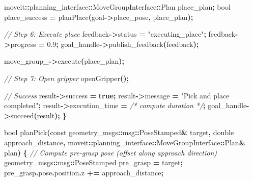 \documentclass[
]{article}
\newenvironment{Shaded}{\begin{snugshade}}{\end{snugshade}}
\newcommand{\AttributeTok}[1]{\textcolor[rgb]{0.13,0.29,0.53}{#1}}
\newcommand{\CommentTok}[1]{\textcolor[rgb]{0.56,0.35,0.01}{\textit{#1}}}
\newcommand{\DataTypeTok}[1]{\textcolor[rgb]{0.13,0.29,0.53}{#1}}
\newcommand{\FloatTok}[1]{\textcolor[rgb]{0.00,0.00,0.81}{#1}}
\newcommand{\KeywordTok}[1]{\textcolor[rgb]{0.13,0.29,0.53}{\textbf{#1}}}
\newcommand{\NormalTok}[1]{#1}
\newcommand{\OperatorTok}[1]{\textcolor[rgb]{0.81,0.36,0.00}{\textbf{#1}}}
\newcommand{\StringTok}[1]{\textcolor[rgb]{0.31,0.60,0.02}{#1}}
\newcommand{\VariableTok}[1]{\textcolor[rgb]{0.00,0.00,0.00}{#1}}
\begin{document}
\begin{Shaded}
\begin{Highlighting}[]
\NormalTok{        moveit}\OperatorTok{::}\NormalTok{planning\_interface}\OperatorTok{::}\NormalTok{MoveGroupInterface}\OperatorTok{::}\NormalTok{Plan place\_plan}\OperatorTok{;}
        \DataTypeTok{bool}\NormalTok{ place\_success }\OperatorTok{=}\NormalTok{ planPlace}\OperatorTok{(}\NormalTok{goal}\OperatorTok{{-}\textgreater{}}\NormalTok{place\_pose}\OperatorTok{,}\NormalTok{ place\_plan}\OperatorTok{);}

        \CommentTok{// Step 6: Execute place}
\NormalTok{        feedback}\OperatorTok{{-}\textgreater{}}\NormalTok{status }\OperatorTok{=} \StringTok{"executing\_place"}\OperatorTok{;}
\NormalTok{        feedback}\OperatorTok{{-}\textgreater{}}\NormalTok{progress }\OperatorTok{=} \FloatTok{0.9}\OperatorTok{;}
\NormalTok{        goal\_handle}\OperatorTok{{-}\textgreater{}}\NormalTok{publish\_feedback}\OperatorTok{(}\NormalTok{feedback}\OperatorTok{);}

        \VariableTok{move\_group\_}\OperatorTok{{-}\textgreater{}}\NormalTok{execute}\OperatorTok{(}\NormalTok{place\_plan}\OperatorTok{);}

        \CommentTok{// Step 7: Open gripper}
\NormalTok{        openGripper}\OperatorTok{();}

        \CommentTok{// Success}
\NormalTok{        result}\OperatorTok{{-}\textgreater{}}\NormalTok{success }\OperatorTok{=} \KeywordTok{true}\OperatorTok{;}
\NormalTok{        result}\OperatorTok{{-}\textgreater{}}\NormalTok{message }\OperatorTok{=} \StringTok{"Pick and place completed"}\OperatorTok{;}
\NormalTok{        result}\OperatorTok{{-}\textgreater{}}\NormalTok{execution\_time }\OperatorTok{=} \CommentTok{/* compute duration */}\OperatorTok{;}
\NormalTok{        goal\_handle}\OperatorTok{{-}\textgreater{}}\NormalTok{succeed}\OperatorTok{(}\NormalTok{result}\OperatorTok{);}
    \OperatorTok{\}}

    \DataTypeTok{bool}\NormalTok{ planPick}\OperatorTok{(}\AttributeTok{const}\NormalTok{ geometry\_msgs}\OperatorTok{::}\NormalTok{msg}\OperatorTok{::}\NormalTok{PoseStamped}\OperatorTok{\&}\NormalTok{ target}\OperatorTok{,}
                  \DataTypeTok{double}\NormalTok{ approach\_distance}\OperatorTok{,}
\NormalTok{                  moveit}\OperatorTok{::}\NormalTok{planning\_interface}\OperatorTok{::}\NormalTok{MoveGroupInterface}\OperatorTok{::}\NormalTok{Plan}\OperatorTok{\&}\NormalTok{ plan}\OperatorTok{)} \OperatorTok{\{}
        \CommentTok{// Compute pre{-}grasp pose (offset along approach direction)}
\NormalTok{        geometry\_msgs}\OperatorTok{::}\NormalTok{msg}\OperatorTok{::}\NormalTok{PoseStamped pre\_grasp }\OperatorTok{=}\NormalTok{ target}\OperatorTok{;}
\NormalTok{        pre\_grasp}\OperatorTok{.}\NormalTok{pose}\OperatorTok{.}\NormalTok{position}\OperatorTok{.}\NormalTok{z }\OperatorTok{+=}\NormalTok{ approach\_distance}\OperatorTok{;}


\end{Highlighting}
\end{Shaded}
\end{document}
